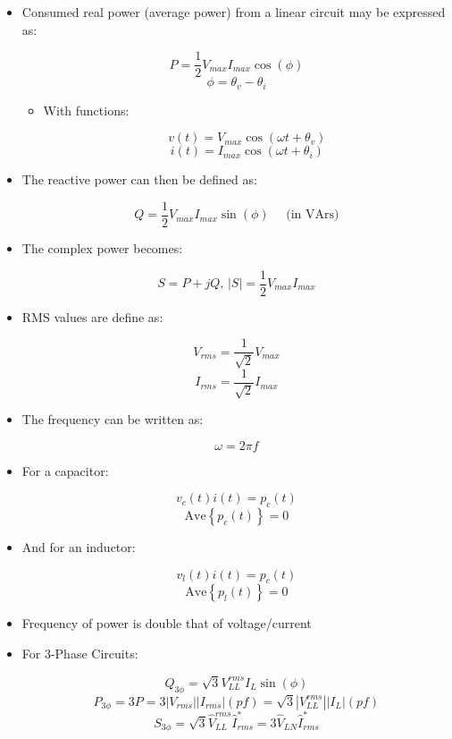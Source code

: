 \begin{itemize}

  \item Consumed real power (average power) from a linear circuit may be expressed as:

    $$P=\frac{1}{2}V_{max}I_{max}\cos(\phi)$$
    $$\phi=\theta_v-\theta_i$$

    \begin{itemize}

      \item With functions:

        $$v(t)=V_{max}\cos(\omega t+\theta_v)$$
        $$i(t)=I_{max}\cos(\omega t+\theta_i)$$

    \end{itemize}

  \item The reactive power can then be defined as:

    $$Q=\frac{1}{2}V_{max}I_{max}\sin(\phi)\quad\text{ (in VArs)}$$

  \item The complex power becomes:

    $$S=P+jQ,\, |S|=\frac{1}{2}V_{max}I_{max}$$

  \item RMS values are define as:

    $$V_{rms}=\frac{1}{\sqrt{2}}V_{max}$$
    $$I_{rms}=\frac{1}{\sqrt{2}}I_{max}$$

  \item The frequency can be written as:

    $$\omega=2\pi f$$

  \item For a capacitor:

    $$v_c(t)i(t)=p_c(t)$$
    $$\text{Ave}\left\{ p_c(t) \right\}=0$$

  \item And for an inductor:

    $$v_l(t)i(t)=p_c(t)$$
    $$\text{Ave}\left\{ p_l(t) \right\}=0$$

  \item Frequency of power is double that of voltage/current

  \item For 3-Phase Circuits:

    $$Q_{3\phi}=\sqrt{3}V_{LL}^{rms}I_L\sin(\phi)$$
    $$P_{3\phi}=3P=3|V_{rms}||I_{rms}|(pf)=\sqrt{3}|V_{LL}^{rms}||I_L|(pf)$$
    $$S_{3\phi}=\sqrt{3}\hat{V}_{LL}^{rms}\hat{I}_{rms}^{*}=3\hat{V}_{LN}\hat{I}_{rms}^{*}$$


\end{itemize}
